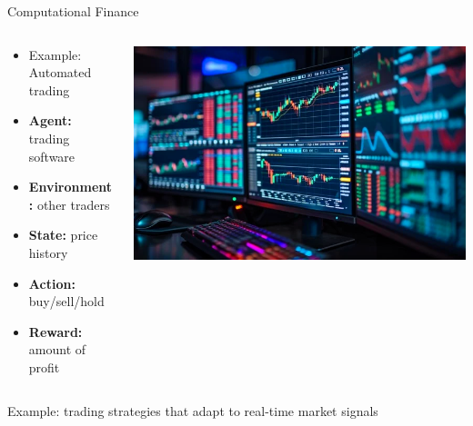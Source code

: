\documentclass[11pt,table]{beamer}
\begin{document}
\begin{frame}{Computational Finance}
\vspace{-11mm}
\begin{columns}[T]
\begin{column}{0.5\textwidth}
\begin{itemize}
    \item  Example: Automated trading

\item \textbf{Agent:} trading software
\item \textbf{Environment:} other traders
\item \textbf{State:} price history
\item \textbf{Action:} buy/sell/hold
\item \textbf{Reward:} amount of profit

\end{itemize}
\end{column}
\begin{column}{0.45\textwidth}
\centering
\includegraphics[width=1\textwidth]{figures/finance.png}
\end{column}
\end{columns}

\vspace{5mm}
    Example: trading strategies that adapt to real-time market signals

\end{frame}
\end{document}
